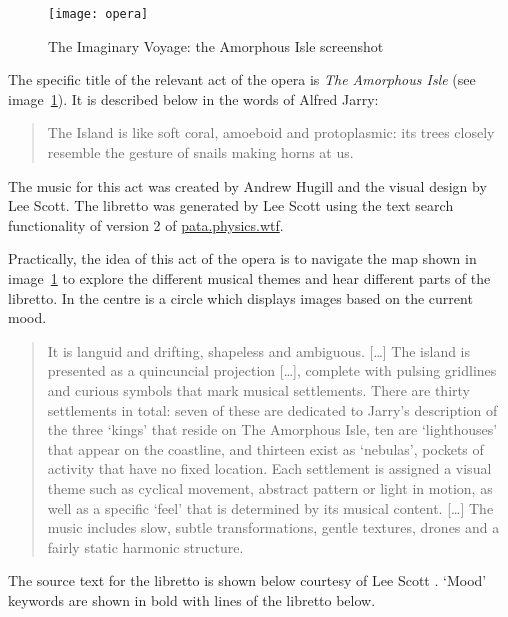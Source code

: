 \begin{figure}[!htbp]
  \centering
  \texttt{[image: opera]}
\caption[Imaginary Voyage: Amorphous Isle]{The Imaginary Voyage: the Amorphous Isle screenshot}
\label{img:opera}
\end{figure}

The specific title of the relevant act of the opera is \emph{The Amorphous Isle} \autocite{Hugill2014a} (see image~\ref{img:opera}). It is described below in the words of Alfred Jarry:

\begin{quotation}
  The Island is like soft coral, amoeboid and protoplasmic: its trees closely resemble the gesture of snails making horns at us. 
\end{quotation}

The music for this act was created by Andrew Hugill and the visual design by Lee Scott. The libretto was generated by Lee Scott using the text search functionality of version 2 of \url{pata.physics.wtf}.

Practically, the idea of this act of the opera is to navigate the map shown in image~\ref{img:opera} to explore the different musical themes and hear different parts of the libretto. In the centre is a circle which displays images based on the current mood.

\begin{quotation}
  It is languid and drifting, shapeless and ambiguous. [\ldots] The island is presented as a quincuncial projection [\ldots], complete with pulsing gridlines and curious symbols that mark musical settlements. There are thirty settlements in total: seven of these are dedicated to Jarry's description of the three `kings' that reside on The Amorphous Isle, ten are `lighthouses' that appear on the coastline, and thirteen exist as `nebulas', pockets of activity that have no fixed location. Each settlement is assigned a visual theme such as cyclical movement, abstract pattern or light in motion, as well as a specific `feel' that is determined by its musical content. [\ldots] The music includes slow, subtle transformations, gentle textures, drones and a fairly static harmonic structure. 
\end{quotation}

The source text for the libretto is shown below courtesy of Lee Scott \citeyear{Scott2014}. `Mood' keywords are shown in bold with lines of the libretto below.

